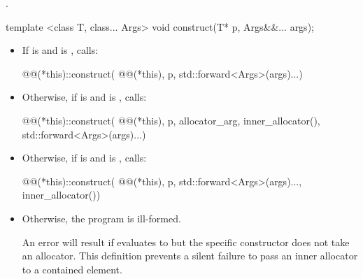 \begin{itemdescr}
\pnum
\returns {}.
\end{itemdescr}

%
\begin{itemdecl}
template <class T, class... Args>
  void construct(T* p, Args&&... args);
\end{itemdecl}

\begin{itemdescr}
\pnum
\effects
\begin{itemize}
\item If  is  and
 is , calls:
\begin{codeblock}
@@(*this)::construct(
    @@(*this), p, std::forward<Args>(args)...)
\end{codeblock}

\item Otherwise, if  is  and
 is , calls:
\begin{codeblock}
@@(*this)::construct(
    @@(*this), p, allocator_arg, inner_allocator(), std::forward<Args>(args)...)
\end{codeblock}

\item Otherwise, if  is  and
 is , calls:
\begin{codeblock}
@@(*this)::construct(
    @@(*this), p, std::forward<Args>(args)..., inner_allocator())
\end{codeblock}

\item Otherwise, the program is ill-formed.
\begin{note}
An error will result if
 evaluates to  but the specific constructor does not take an
allocator. This definition prevents a silent failure to pass an inner allocator to a
contained element.
\end{note}
\end{itemize}
\end{itemdescr}

